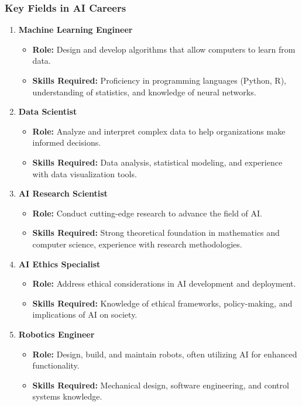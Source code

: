 \documentclass[aspectratio=169]{beamer}
\begin{document}
\begin{frame}[fragile]
    \frametitle{Key Fields in AI Careers}
    \begin{enumerate}
        \item \textbf{Machine Learning Engineer}
        \begin{itemize}
            \item \textbf{Role:} Design and develop algorithms that allow computers to learn from data.
            \item \textbf{Skills Required:} Proficiency in programming languages (Python, R), understanding of statistics, and knowledge of neural networks.
        \end{itemize}
        
        \item \textbf{Data Scientist}
        \begin{itemize}
            \item \textbf{Role:} Analyze and interpret complex data to help organizations make informed decisions.
            \item \textbf{Skills Required:} Data analysis, statistical modeling, and experience with data visualization tools.
        \end{itemize}
        
        \item \textbf{AI Research Scientist}
        \begin{itemize}
            \item \textbf{Role:} Conduct cutting-edge research to advance the field of AI.
            \item \textbf{Skills Required:} Strong theoretical foundation in mathematics and computer science, experience with research methodologies.
        \end{itemize}
        
        \item \textbf{AI Ethics Specialist}
        \begin{itemize}
            \item \textbf{Role:} Address ethical considerations in AI development and deployment.
            \item \textbf{Skills Required:} Knowledge of ethical frameworks, policy-making, and implications of AI on society.
        \end{itemize}
        
        \item \textbf{Robotics Engineer}
        \begin{itemize}
            \item \textbf{Role:} Design, build, and maintain robots, often utilizing AI for enhanced functionality.
            \item \textbf{Skills Required:} Mechanical design, software engineering, and control systems knowledge.
        \end{itemize}
    \end{enumerate}
\end{frame}
\end{document}
